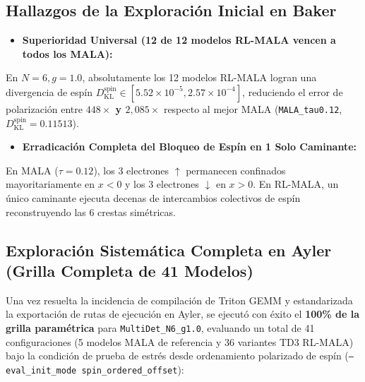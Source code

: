 \documentclass[10pt,a4paper]{article}
\begin{document}
\subsection{Hallazgos de la Exploración Inicial en Baker}

\begin{itemize}
\item \textbf{Superioridad Universal (12 de 12 modelos RL-MALA vencen a todos los MALA):}
\end{itemize}

   En $N=6, g=1.0$, absolutamente los 12 modelos RL-MALA logran una divergencia de espín $D_{\mathrm{KL}}^{\mathrm{spin}} \in [5.52 \times 10^{-5}, 2.57 \times 10^{-4}]$, reduciendo el error de polarización entre \textbf{$448\times$ y $2,085\times$} respecto al mejor MALA (\texttt{MALA\_tau0.12}, $D_{\mathrm{KL}}^{\mathrm{spin}} = 0.11513$).

\begin{itemize}
\item \textbf{Erradicación Completa del Bloqueo de Espín en 1 Solo Caminante:}
\end{itemize}

   En MALA ($\tau=0.12$), los 3 electrones $\uparrow$ permanecen confinados mayoritariamente en $x < 0$ y los 3 electrones $\downarrow$ en $x > 0$. En RL-MALA, un único caminante ejecuta decenas de intercambios colectivos de espín reconstruyendo las 6 crestas simétricas.




\subsection{Exploración Sistemática Completa en Ayler (Grilla Completa de 41 Modelos)}

Una vez resuelta la incidencia de compilación de Triton GEMM y estandarizada la exportación de rutas de ejecución en Ayler, se ejecutó con éxito el \textbf{100\% de la grilla paramétrica} para \texttt{MultiDet\_N6\_g1.0}, evaluando un total de 41 configuraciones (5 modelos MALA de referencia y 36 variantes TD3 RL-MALA) bajo la condición de prueba de estrés desde ordenamiento polarizado de espín (\texttt{--eval\_init\_mode spin\_ordered\_offset}):
\end{document}
